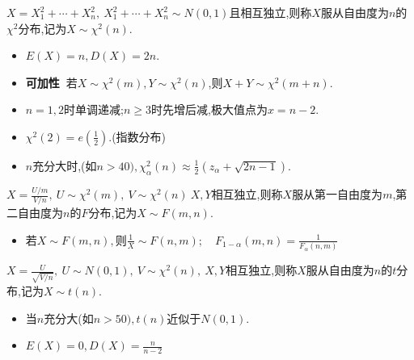 \documentclass[UTF8]{ctexart}
\newenvironment{itemizeg}{\begin{itemize}}{\end{itemize}}
\begin{document}
\begin{tcolorbox}[colframe=green!66!black,title={\subsection{$\chi^2$分布}}]
    $X=X_1^2+\cdots+X_n^2,\ X_1^2+\cdots+X_n^2\sim N(0,1)$且相互独立,则称$X$服从自由度为$n$的$\chi^2$分布,记为$X\sim\chi^2(n).$
\begin{itemizeg}
\item $E(X)=n,D(X)=2n$.
\item \textbf{可加性\ }若$X\sim\chi^2(m),Y\sim\chi^2(n)$,则$X+Y\sim\chi^2(m+n).$
\item $n=1,2$时单调递减;$n\geq 3$时先增后减,极大值点为$x=n-2$.
\item $\chi^2(2)=e\left(\frac{1}{2}\right)$.(指数分布)
\item $n$充分大时,(如$n>40),\chi_\alpha^2(n)\approx\frac{1}{2}\left(z_\alpha+\sqrt{2n-1}\right).$
\end{itemizeg}
\end{tcolorbox}

\begin{tcolorbox}[colframe=green!66!black,title={\subsection{$F$分布}}]
    $X=\frac{U/m}{V/n},\ U\sim\chi^2(m),\ V\sim\chi^2(n)\ X,Y$相互独立,则称$X$服从第一自由度为$m$,第二自由度为$n$的$F$分布,记为$X\sim F(m,n).$
    \begin{itemizeg}
        \item 若$X\sim F(m,n),$则$\frac{1}{X}\sim F(n,m);\quad F_{1-\alpha}(m,n)=\frac{1}{F_{\alpha}(n,m)}$
    \end{itemizeg}

\end{tcolorbox}

\begin{tcolorbox}[colframe=green!66!black,title={\subsection{$t$分布}}]
    $X=\frac{U}{\sqrt{V/n}},\ U\sim N(0,1),\ V\sim\chi^2(n),\ X,Y$相互独立,则称$X$服从自由度为$n$的$t$分布,记为$X\sim t(n)$.
    \begin{itemizeg}
        \item 当$n$充分大(如$n>50),t(n)$近似于$N(0,1).$
        \item $E(X)=0,D(X)=\frac{n}{n-2}$
    \end{itemizeg}
\end{tcolorbox}
\end{document}

